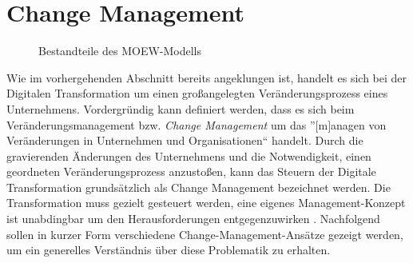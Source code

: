 \section{Change Management}

\begin{figure}[h]
	\centering
	\caption[Bestandteile des MOEW-Modells]{Bestandteile des MOEW-Modells \protect \cite[S. 12]{kaune_change_2016}}
	\label{fig:moew}
\end{figure}

Wie im vorhergehenden Abschnitt bereits angeklungen ist, handelt es sich bei der Digitalen Transformation um einen großangelegten Veränderungsprozess eines Unternehmens. Vordergründig kann definiert werden, dass es sich beim Veränderungsmanagement bzw. \textit{Change Management} um das ''$\lbrack$m$\rbrack$anagen von Veränderungen in Unternehmen und Organisationen`` \cite[S. 10]{kaune_change_2016} handelt. Durch die gravierenden Änderungen des Unternehmens und die Notwendigkeit, einen geordneten Veränderungsprozess anzustoßen, kann das Steuern der Digitale Transformation grundsätzlich als Change Management bezeichnet werden. Die Transformation muss gezielt gesteuert werden, eine eigenes Management-Konzept ist unabdingbar um den Herausforderungen entgegenzuwirken \cite[S. 19]{hess_digitale_2019}. Nachfolgend sollen in kurzer Form verschiedene Change-Management-Ansätze gezeigt werden, um ein generelles Verständnis über diese Problematik zu erhalten.

